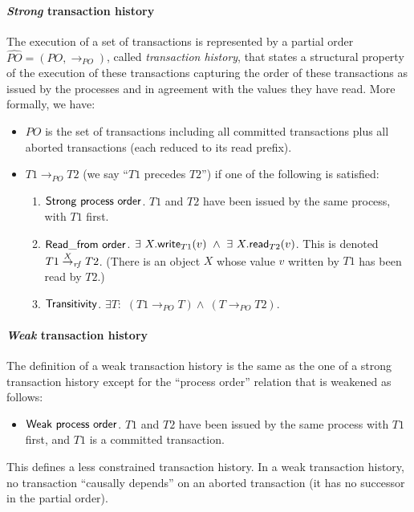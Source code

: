 \paragraph{{\it Strong} transaction history} 
The execution of a set of transactions is represented by a 
partial   order  $\widehat{\mathit{PO}}=   (PO,  \rightarrow_\mathit{PO})$,
called {\it transaction history}, 
that states  a structural property of the execution of these transactions
capturing the order of these transactions as issued by the processes 
and in agreement with the values they  have read. More formally, we have:
%
\begin{itemize}
\vspace{-0.2cm}
\item $PO$ is the set of  transactions including all committed transactions 
plus all  aborted transactions (each reduced to its read prefix).  
\vspace{-0.2cm}
\item $T1 \rightarrow_\mathit{PO} T2$ (we say ``$T1$ precedes $T2$'') if
one of the following is satisfied: 
\begin{enumerate}
\vspace{-0.2cm}
\item ${\sf Strong~process~ order}$.
$T1$ and $T2$ have been issued by the same process,  with $T1$ first.
%
\vspace{-0.2cm}
\item ${\sf Read\_from~order}$. 
$\exists ~ X.{\sf write}_{T1}(v)~ \wedge ~ \exists ~ X.{\sf read}_{T2}(v)$. 
This is denoted   $T1 \stackrel{X}{\rightarrow}_{\mathit{rf}} T2$. 
(There is an object $X$ whose value $v$ written by $T1$ has been read by $T2$.)
%
\vspace{-0.1cm}
\item ${\sf Transitivity}$. 
$\exists T:$  $(T1 \rightarrow_\mathit{PO} T)  \wedge ~ 
(T \rightarrow_\mathit{PO} T2)$.  
\end{enumerate}
\end{itemize}
\vspace{-0.2cm}

\paragraph{{\it Weak} transaction history} 
The definition of a  weak transaction history is the same as the one of
a  strong transaction history  except for the ``process order''
 relation that is weakened as follows:
\begin{itemize}
\vspace{-0.2cm}
\item ${\sf Weak~process~ order}$.
$T1$ and $T2$ have been issued by the same process with $T1$ first, 
and  $T1$ is a committed transaction. 
%
\end{itemize}
\vspace{-0.2cm}
This defines a less constrained  transaction history. 
In a weak transaction history,  no transaction ``causally  depends'' 
on an aborted transaction (it has no successor in the partial order). 



